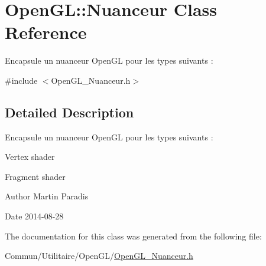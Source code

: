 \hypertarget{class_open_g_l_1_1_nuanceur}{}\section{Open\+G\+L\+:\+:Nuanceur Class Reference}
\label{class_open_g_l_1_1_nuanceur}


Encapsule un nuanceur Open\+G\+L pour les types suivants \+:  




{\ttfamily \#include $<$Open\+G\+L\+\_\+\+Nuanceur.\+h$>$}



\subsection{Detailed Description}
Encapsule un nuanceur Open\+G\+L pour les types suivants \+: 


\begin{DoxyItemize}
\item Vertex shader
\item Fragment shader
\end{DoxyItemize}

\begin{DoxyAuthor}{Author}
Martin Paradis 
\end{DoxyAuthor}
\begin{DoxyDate}{Date}
2014-\/08-\/28 
\end{DoxyDate}


The documentation for this class was generated from the following file\+:\begin{DoxyCompactItemize}
\item 
Commun/\+Utilitaire/\+Open\+G\+L/\hyperlink{_open_g_l___nuanceur_8h}{Open\+G\+L\+\_\+\+Nuanceur.\+h}\end{DoxyCompactItemize}
